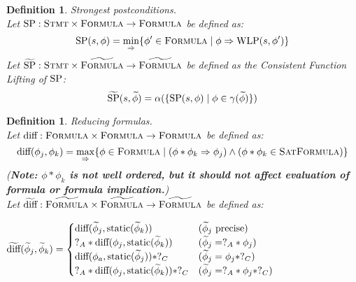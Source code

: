 \documentclass {article}
\newtheorem{definition}[theorem]{Definition}
\newcommand{\tphi}{\widetilde{\phi}}
\newcommand{\imp}{\Rightarrow}
\newcommand{\wlp}[2]{\textup{WLP}(#1,#2)}
\newcommand{\static}[1]{\textup{static}(#1)}
\newcommand{\diff}[2]{\textup{diff}(#1,#2)}
\newcommand{\tdiff}[2]{\widetilde{\textup{diff}}(#1,#2)}
\newcommand{\satdef}{\textsc{SatFormula}}
\newcommand{\formula}{\textsc{Formula}}
\newcommand{\gradformula}{\widetilde{\textsc{Formula}}}
\begin{document}
\vspace{5mm}
\begin{definition} Strongest postconditions.\\
Let $\textup{SP} : \textsc{Stmt} \times \formula \rightarrow \formula$ be defined as: 
$$\textup{SP}(s, \phi) = \min_{\imp}\{\phi' \in \formula \mid \phi \imp \wlp{s}{\phi'} \}$$
Let $\widetilde{\textup{SP}}: \textsc{Stmt} \times \gradformula \rightarrow \gradformula$ be defined as the Consistent Function Lifting of $\textup{SP}$:
$$\widetilde{\textup{SP}}(s, \tphi) = \alpha(\{\textup{SP}(s,\phi) \mid \phi \in \gamma(\tphi)\})$$

\end{definition}
\vspace{5mm}
\begin{definition} Reducing formulas.\\
Let $\textup{diff} : \formula \times \formula \rightarrow \formula$ be defined as: 
$$\textup{diff}(\phi_j,\phi_k)=\max_{\imp}\{\phi \in \formula \mid (\phi \ast \phi_k \imp \phi_j) \wedge (\phi \ast \phi_k \in \satdef) \}$$
(\textbf{Note: $\phi \ast \phi_k$ is not well ordered, but it should not affect evaluation of formula or formula implication.})\\
Let $\widetilde{\text{diff}} : \gradformula \times \gradformula \rightarrow \gradformula$ be defined as:
\begin{center}
$  \tdiff{\tphi_j}{\tphi_k} = 
\begin{cases}
     \diff{\tphi_j}{\static{\tphi_k}} & (\tphi_j\text{ precise})\\
     ?_A \ast \diff{\phi_j}{\static{\tphi_k}} & (\tphi_j = ?_A \ast \phi_j)\\
     \diff{\phi_a}{\static{\tphi_j}} \ast ?_C & (\tphi_j = \phi_j \ast ?_C)\\
     ?_A \ast \diff{\phi_j}{\static{\tphi_k}} \ast ?_C& (\tphi_j = ?_A \ast \phi_j \ast ?_C)\\
\end{cases}
$
\end{center}
\end{definition}
\end{document}

